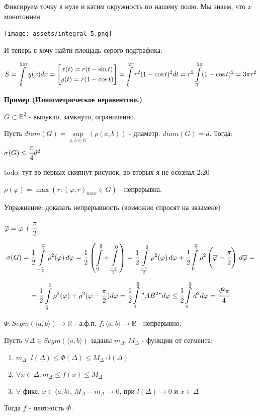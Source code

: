 Фиксируем точку в нуле и катим окружность по нашему полю. Мы знаем, что $x$ монотоннен
\begin{center}
   \texttt{[image: assets/integral\_5.png]}
\end{center}
И теперь я хочу найти площадь серого подграфика:

$S  = \displaystyle\int\limits_{0}^{2\pi r}y(x)dx  = \left [ \begin{gathered}
    x(t) = r(t-\sin t) \\
    y(t) = r(1-\cos t)
\end{gathered}\right] = \displaystyle\int\limits_{0}^{2\pi}r^2(1-\cos t)^2 dt = r^2\displaystyle\int\limits_{0}^{2\pi}(1-\cos t)^2 = 3 \pi r^2$


\textbf{Пример (Изопометрическое неравентсво.)}

$G \subset \mathbb{R}^2$ - выпукло, замкнуто, ограниченно. 

Пусть $diam(G) = \sup\limits_{a,b\in G} (\rho(a,b))$ - диаметр. $diam(G) = d$. Тогда: $\sigma(G)\leq \cfrac{\pi}{4}d^2$

todo: тут во-первых скипнут рисунок, во-вторых я не осознал 2:20

$\rho(\varphi) = \max (r: (\varphi,r)_{max} \in G)$ -  непрерывна.

Упражнение: доказать непрерывность (возможно спросят на экзамене)

$\overline{\varphi} = \varphi + \cfrac{\pi}{2}$

$$\sigma(G)= \frac{1}{2}\displaystyle\int\limits_{-\frac{\pi}{2}}^{\frac{\pi}{2}}\rho^2(\varphi)\,d\varphi = \frac{1}{2}\left(\displaystyle\int\limits_{0}^{\frac{\pi}{2}} + \displaystyle\int\limits_{\frac{-\pi}{2}}^{0}\right) = \frac{1}{2}\displaystyle\int\limits_{\frac{-\pi}{2}}^{0}\rho^2(\varphi)\, d \varphi  + \cfrac{1}{2}\displaystyle\int\limits_{0}^{\frac{\pi}{2}}\rho^2\left(\overline{\varphi}-\cfrac{\pi}{2}\right)\,
d\overline{\varphi}=$$

$$=\frac{1}{2}\displaystyle\int\limits_{\frac{\pi}{2}}^{0}\rho^2(\varphi) + \rho^2(\varphi - \frac{\pi}{2}) d\varphi = \cfrac{1}{2}\displaystyle\int\limits_{0}^{\frac{\pi}{2}}"AB^2" d\varphi \leq \cfrac{1}{2}\displaystyle\int\limits_{0}^{\frac{\pi}{2}}d^2 d\varphi = \frac{d^2\pi}{4}$$


$\varPhi: Segm(\langle a,b\rangle) \rightarrow \mathbb{R}$ - а.ф.п. $f: \langle a,b \rangle \rightarrow \mathbb{R}$ - непрерывно.

Пусть $\forall\Delta \in Segm(\langle a,b \rangle)$ заданы $m_\Delta, M_{\Delta} $ - функции от сегмента:

\begin{enumerate}
    \item $m_\Delta\cdot l(\Delta) \leq \varPhi(\Delta) \leq M_{\Delta} \cdot l(\Delta)$
    \item $\forall x  \in \Delta: m_{\Delta}\leq f(x)\leq M_{\Delta}$
    \item $\forall$ фикс. $x\in \langle a,b \rangle$, $M_{\Delta}-m_{\Delta}\rightarrow 0$, при $l(\Delta)\rightarrow 0 $ и $x\in \Delta$ 
\end{enumerate}
Тогда $f$ - плотность $\varPhi$. 

